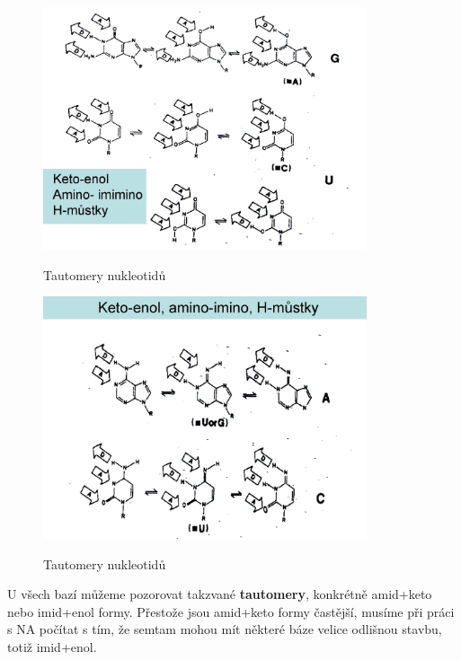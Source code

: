 \documentclass[DIV=8]{scrreprt}
\begin{document}
\begin{figure}
    \caption{Tautomery nukleotidů}
    \includegraphics[width=0.85\textwidth]{slides-3/slide-47.jpg}
    \centering
    \label{}
\end{figure}

\begin{figure}
    \caption{Tautomery nukleotidů}
    \includegraphics[width=0.85\textwidth]{slides-3/slide-48.jpg}
    \centering
    \label{}
\end{figure}


U všech bazí můžeme pozorovat takzvané \textbf{tautomery}, konkrétně amid+keto nebo imid+enol formy. Přestože jsou amid+keto formy častější, musíme při práci s NA počítat s tím, že semtam mohou mít některé báze velice odlišnou stavbu, totiž imid+enol.
\end{document}
